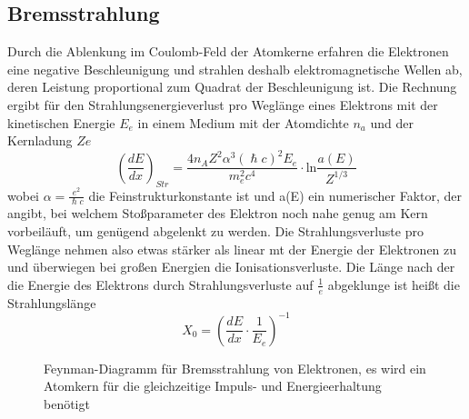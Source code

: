 \documentclass[Ex4_Zusammenfassung.tex]{subfiles}
\begin{document}
\subsection{Bremsstrahlung}
Durch die Ablenkung im Coulomb-Feld der Atomkerne erfahren die Elektronen eine negative Beschleunigung und strahlen deshalb elektromagnetische Wellen ab, deren Leistung proportional zum Quadrat der Beschleunigung ist. Die Rechnung ergibt für den Strahlungsenergieverlust pro Weglänge eines Elektrons mit der kinetischen Energie $E_e$ in einem Medium mit der Atomdichte $n_a$ und der Kernladung $Ze$
\begin{equation}
\left( \frac{dE}{dx} \right)_{Str} = \frac{4 n_A Z^2 \alpha^3 (\hslash c)^2 E_e}{m_e^2 c^4} \cdot \text{ln} \frac{a(E)}{Z^{1/3}} 
\end{equation}
wobei $\alpha = \frac{e^2}{\hslash c} $ die Feinstrukturkonstante ist und a(E) ein numerischer Faktor, der angibt, bei welchem Stoßparameter des Elektron noch nahe genug am Kern vorbeiläuft, um genügend abgelenkt zu werden. Die Strahlungsverluste pro Weglänge nehmen also etwas stärker als linear mt der Energie der Elektronen zu und überwiegen bei großen Energien die Ionisationsverluste. \newline
Die Länge nach der die Energie des Elektrons durch Strahlungsverluste auf $\frac{1}{e} $ abgeklunge ist heißt die Strahlungslänge 
\begin{equation}
X_0 = \left( \frac{dE}{dx} \cdot \frac{1}{E_e} \right)^{-1}
\end{equation}

	\begin{figure}[H]
	\centering
		\caption{Feynman-Diagramm für Bremsstrahlung von Elektronen, es wird ein Atomkern für die gleichzeitige Impuls- und Energieerhaltung benötigt}
	\end{figure}
\end{document}
